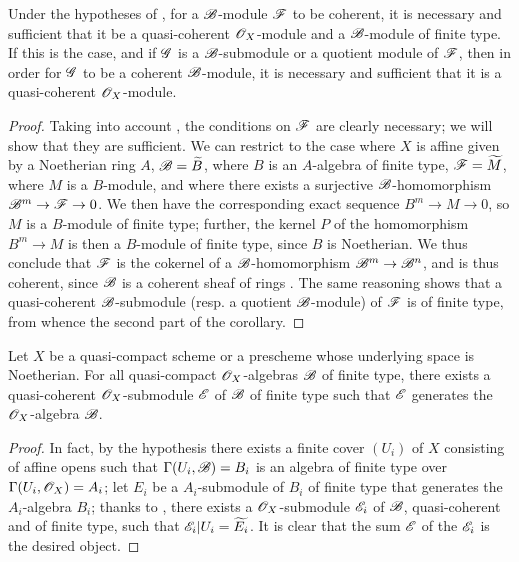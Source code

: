\begin{cor}[9.6.4]
\label{1.9.6.4}
Under the hypotheses of , for a $\mathscr{B}$-module $\mathscr{F}$ to be coherent, it is necessary and sufficient that it be a quasi-coherent $\mathscr{O}_X$-module and a $\mathscr{B}$-module of finite type.
If this is the case, and if $\mathscr{G}$ is a $\mathscr{B}$-submodule or a quotient module of $\mathscr{F}$, then in order for $\mathscr{G}$ to be a coherent $\mathscr{B}$-module, it is necessary and sufficient that it is a quasi-coherent $\mathscr{O}_X$-module.
\end{cor}

\begin{proof}
\label{proof-1.9.6.4}
Taking into account , the conditions on $\mathscr{F}$ are clearly necessary; we will show that they are sufficient.
We can restrict to the case where $X$ is affine given by a Noetherian ring $A$, $\mathscr{B}={\widetilde{B}}$, where $B$ is an $A$-algebra of finite type, $\mathscr{F}={\widetilde{M}}$, where $M$ is a $B$-module, and where there exists a surjective $\mathscr{B}$-homomorphism $\sh{B}^m\to\sh{F}\to0$.
We then have the corresponding exact sequence $B^m\to M\to0$, so $M$ is a $B$-module of finite type; further, the kernel $P$ of the homomorphism $B^m\to M$ is then a $B$-module of finite type, since $B$ is Noetherian.
We thus conclude  that $\mathscr{F}$ is the cokernel of a $\mathscr{B}$-homomorphism $\sh{B}^m\to\sh{B}^n$, and is thus coherent, since $\mathscr{B}$ is a coherent sheaf of rings .
The same reasoning shows that a quasi-coherent $\mathscr{B}$-submodule (resp. a quotient $\mathscr{B}$-module) of $\mathscr{F}$ is of finite type, from whence the second part of the corollary.
\end{proof}

\begin{prop}[9.6.5]
\label{1.9.6.5}
Let $X$ be a quasi-compact scheme or a prescheme whose underlying space is Noetherian.
For all quasi-compact $\mathscr{O}_X$-algebras $\mathscr{B}$ of finite type, there exists a quasi-coherent $\mathscr{O}_X$-submodule $\mathscr{E}$ of $\mathscr{B}$ of finite type such that $\mathscr{E}$ generates  the $\mathscr{O}_X$-algebra $\mathscr{B}$.
\end{prop}

\begin{proof}
\label{proof-1.9.6.5}
In fact, by the hypothesis there exists a finite cover $(U_i)$ of $X$ consisting of affine opens such that $\Gamma(U_i,\mathscr{B})=B_i$ is an algebra of finite type over $\Gamma(U_i,\mathscr{O}_X)=A_i$; let $E_i$ be a $A_i$-submodule of $B_i$ of finite type that generates the $A_i$-algebra $B_i$; thanks to , there exists a $\mathscr{O}_X$-submodule $\mathscr{E}_i$ of $\mathscr{B}$, quasi-coherent and of finite type, such that $\mathscr{E}_i|U_i={\widetilde{E_i}}$.
It is clear that the sum $\mathscr{E}$ of the $\mathscr{E}_i$ is the desired object.
\end{proof}

